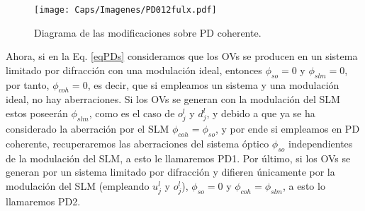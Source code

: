 





\begin{figure}[!ht]
  \centering
    \texttt{[image: Caps/Imagenes/PD012fulx.pdf]}
  \caption{Diagrama de las modificaciones sobre PD coherente.}
  \label{fig:PD012}
\end{figure}

Ahora, si en la Eq. \ref{eqPDs} consideramos que los OVs se producen en un sistema limitado por difracción con una modulación ideal, entonces $\phi_{so} = 0$ y $\phi_{slm} = 0$, por tanto, $\phi_{coh} = 0$, es decir, que si empleamos un sistema y una modulación ideal, no hay aberraciones. Si los OVs se generan con la modulación del SLM estos poseerán $\phi_{slm}$, como es el caso de $o_j^l$ y $d_j^l$, y debido a que ya se ha considerado la aberración por el SLM $\phi_{coh} = \phi_{so}$, y por ende si empleamos  en PD coherente, recuperaremos las aberraciones del sistema óptico $\phi_{so}$ independientes de la modulación del SLM, a esto le llamaremos PD1. Por último, si los OVs se generan por un sistema limitado por difracción y difieren únicamente por la modulación del SLM (empleando $u_{j}^{l}$ y $o_{j}^l$), $\phi_{so} = 0$ y $\phi_{coh} = \phi_{slm}$, a esto lo llamaremos PD2.\\

